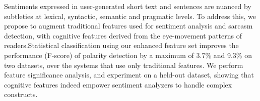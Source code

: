 Sentiments expressed in user-generated short text and sentences are nuanced by subtleties at lexical, syntactic, semantic and pragmatic levels. To address this, we propose to augment traditional features used for sentiment analysis and sarcasm detection, with cognitive features derived from the eye-movement patterns of readers.Statistical classification using our enhanced feature set improves the performance (F-score) of polarity detection by a maximum of 3.7\% and 9.3\% on two datasets, over the systems that use only traditional features. We perform feature significance analysis, and experiment on a held-out dataset, showing that cognitive features indeed empower sentiment analyzers to handle complex constructs.
